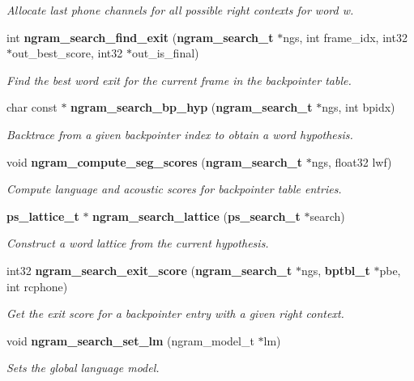 \begin{DoxyCompactItemize}
\begin{DoxyCompactList}\small\item\em Allocate last phone channels for all possible right contexts for word w. \end{DoxyCompactList}\item 
int {\bf ngram\-\_\-search\-\_\-find\-\_\-exit} ({\bf ngram\-\_\-search\-\_\-t} $\ast$ngs, int frame\-\_\-idx, int32 $\ast$out\-\_\-best\-\_\-score, int32 $\ast$out\-\_\-is\-\_\-final)
\begin{DoxyCompactList}\small\item\em Find the best word exit for the current frame in the backpointer table. \end{DoxyCompactList}\item 
char const $\ast$ {\bf ngram\-\_\-search\-\_\-bp\-\_\-hyp} ({\bf ngram\-\_\-search\-\_\-t} $\ast$ngs, int bpidx)
\begin{DoxyCompactList}\small\item\em Backtrace from a given backpointer index to obtain a word hypothesis. \end{DoxyCompactList}\item 
void {\bf ngram\-\_\-compute\-\_\-seg\-\_\-scores} ({\bf ngram\-\_\-search\-\_\-t} $\ast$ngs, float32 lwf)\label{ngram__search_8h_a2fa760c99f77eb075157304f4359941e}

\begin{DoxyCompactList}\small\item\em Compute language and acoustic scores for backpointer table entries. \end{DoxyCompactList}\item 
{\bf ps\-\_\-lattice\-\_\-t} $\ast$ {\bf ngram\-\_\-search\-\_\-lattice} ({\bf ps\-\_\-search\-\_\-t} $\ast$search)\label{ngram__search_8h_ac30e7dec4bbfeee9f5163abf4bbd1014}

\begin{DoxyCompactList}\small\item\em Construct a word lattice from the current hypothesis. \end{DoxyCompactList}\item 
int32 {\bf ngram\-\_\-search\-\_\-exit\-\_\-score} ({\bf ngram\-\_\-search\-\_\-t} $\ast$ngs, {\bf bptbl\-\_\-t} $\ast$pbe, int rcphone)\label{ngram__search_8h_a25a80e488425b2bd4e24eb753c9295a5}

\begin{DoxyCompactList}\small\item\em Get the exit score for a backpointer entry with a given right context. \end{DoxyCompactList}\item 
void {\bf ngram\-\_\-search\-\_\-set\-\_\-lm} (ngram\-\_\-model\-\_\-t $\ast$lm)
\begin{DoxyCompactList}\small\item\em Sets the global language model. \end{DoxyCompactList}\end{DoxyCompactItemize}


